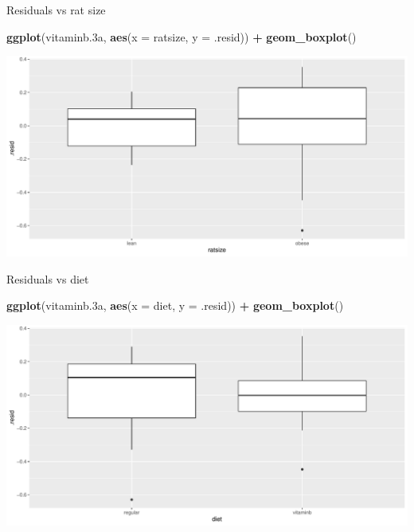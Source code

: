 \documentclass[
  ignorenonframetext,
]{beamer}
\newenvironment{Shaded}{\begin{snugshade}}{\end{snugshade}}
\newcommand{\DataTypeTok}[1]{\textcolor[rgb]{0.13,0.29,0.53}{#1}}
\newcommand{\FloatTok}[1]{\textcolor[rgb]{0.00,0.00,0.81}{#1}}
\newcommand{\KeywordTok}[1]{\textcolor[rgb]{0.13,0.29,0.53}{\textbf{#1}}}
\newcommand{\NormalTok}[1]{#1}
\newcommand{\OperatorTok}[1]{\textcolor[rgb]{0.81,0.36,0.00}{\textbf{#1}}}
\newcommand{\StringTok}[1]{\textcolor[rgb]{0.31,0.60,0.02}{#1}}
\begin{document}
\begin{frame}[fragile]{Residuals vs rat size}
\protect\hypertarget{residuals-vs-rat-size}{}

\begin{Shaded}
\begin{Highlighting}[]
\KeywordTok{ggplot}\NormalTok{(vitaminb}\FloatTok{.3}\NormalTok{a, }\KeywordTok{aes}\NormalTok{(}\DataTypeTok{x =}\NormalTok{ ratsize, }\DataTypeTok{y =}\NormalTok{ .resid)) }\OperatorTok{+}\StringTok{ }
\StringTok{  }\KeywordTok{geom_boxplot}\NormalTok{()}
\end{Highlighting}
\end{Shaded}

\includegraphics{slides_d29_files/figure-beamer/unnamed-chunk-207-1.pdf}

\end{frame}

\begin{frame}[fragile]{Residuals vs diet}
\protect\hypertarget{residuals-vs-diet}{}

\begin{Shaded}
\begin{Highlighting}[]
\KeywordTok{ggplot}\NormalTok{(vitaminb}\FloatTok{.3}\NormalTok{a, }\KeywordTok{aes}\NormalTok{(}\DataTypeTok{x =}\NormalTok{ diet, }\DataTypeTok{y =}\NormalTok{ .resid)) }\OperatorTok{+}\StringTok{ }
\StringTok{  }\KeywordTok{geom_boxplot}\NormalTok{()}
\end{Highlighting}
\end{Shaded}

\includegraphics{slides_d29_files/figure-beamer/unnamed-chunk-208-1.pdf}

\end{frame}
\end{document}
